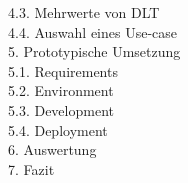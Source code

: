 \begin{small}
	\noindent\hspace*{10mm}%
	4.3. Mehrwerte von DLT\\
	\noindent\hspace*{10mm}%
	4.4. Auswahl eines Use-case\\
	5. Prototypische Umsetzung\\
	\noindent\hspace*{10mm}%
	5.1. Requirements\\
	\noindent\hspace*{10mm}%
	5.2. Environment\\
	\noindent\hspace*{10mm}%
	5.3. Development\\
	\noindent\hspace*{10mm}%
	5.4. Deployment\\
	6. Auswertung\\
	7. Fazit\\
\end{small}

\newpage